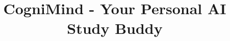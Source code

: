 \documentclass[twoside,final]{hcmut-report}
\title{CogniMind - Your Personal AI Study Buddy}
\begin{document}
\coverpage%


\tableofcontents

\clearpage











\nocite{*}
\end{document}
